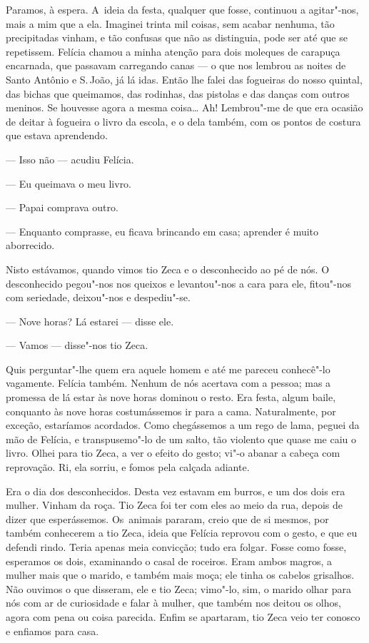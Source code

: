 \begin{linenumbers}
Paramos, à espera. A~ideia da festa, qualquer que fosse, continuou a
agitar"-nos, mais a mim que a ela. Imaginei trinta mil coisas, sem acabar
nenhuma, tão precipitadas vinham, e tão confusas que não as distinguia,
pode ser até que se repetissem. Felícia chamou a minha atenção para dois
moleques de carapuça encarnada, que passavam carregando canas --- o que
nos lembrou as noites de Santo Antônio e S.\,João, já lá idas. Então lhe
falei das fogueiras do nosso quintal, das bichas que queimamos, das
rodinhas, das pistolas e das danças com outros meninos. Se houvesse
agora a mesma coisa\ldots{} Ah! Lembrou"-me de que era ocasião de deitar à
fogueira o livro da escola, e o dela também, com os pontos de costura
que estava aprendendo.

--- Isso não --- acudiu Felícia.

--- Eu queimava o meu livro.

--- Papai comprava outro.

--- Enquanto comprasse, eu ficava brincando em casa; aprender é muito
aborrecido.

Nisto estávamos, quando vimos tio Zeca e o desconhecido ao pé de nós. O
desconhecido pegou"-nos nos queixos e levantou"-nos a cara para ele,
fitou"-nos com seriedade, deixou"-nos e despediu"-se.

--- Nove horas? Lá estarei --- disse ele.

--- Vamos --- disse"-nos tio Zeca.

Quis perguntar"-lhe quem era aquele homem e até me pareceu conhecê"-lo
vagamente. Felícia também. Nenhum de nós acertava com a pessoa; mas a
promessa de lá estar às nove horas dominou o resto. Era festa, algum
baile, conquanto às nove horas costumássemos ir para a cama.
Naturalmente, por exceção, estaríamos acordados. Como chegássemos a um
rego de lama, peguei da mão de Felícia, e transpusemo"-lo de um salto,
tão violento que quase me caiu o livro. Olhei para tio Zeca, a ver o
efeito do gesto; vi"-o abanar a cabeça com reprovação. Ri, ela sorriu, e
fomos pela calçada adiante.

Era o dia dos desconhecidos. Desta vez estavam em burros, e um dos dois
era mulher. Vinham da roça. Tio Zeca foi ter com eles ao meio da rua,
depois de dizer que esperássemos. Os~animais pararam, creio que de si
mesmos, por também conhecerem a tio Zeca, ideia que Felícia reprovou com
o gesto, e que eu defendi rindo. Teria apenas meia convicção; tudo era
folgar. Fosse como fosse, esperamos os dois, examinando o casal de
roceiros. Eram ambos magros, a mulher mais que o marido, e também mais
moça; ele tinha os cabelos grisalhos. Não ouvimos o que disseram, ele e
tio Zeca; vimo"-lo, sim, o marido olhar para nós com ar de curiosidade e
falar à mulher, que também nos deitou os olhos, agora com pena ou coisa
parecida. Enfim se apartaram, tio Zeca veio ter conosco e enfiamos para
casa.


\end{linenumbers}
